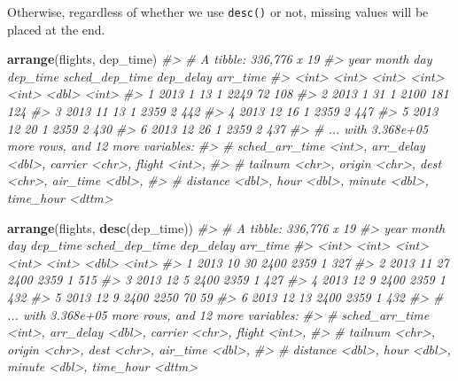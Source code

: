\documentclass[]{book}
\newenvironment{Shaded}{\begin{snugshade}}{\end{snugshade}}
\newcommand{\CommentTok}[1]{\textcolor[rgb]{0.56,0.35,0.01}{\textit{#1}}}
\newcommand{\KeywordTok}[1]{\textcolor[rgb]{0.13,0.29,0.53}{\textbf{#1}}}
\newcommand{\NormalTok}[1]{#1}
\theoremstyle{plain}
\theoremstyle{remark}
\begin{document}
Otherwise, regardless of whether we use \texttt{desc()} or not, missing
values will be placed at the end.

\begin{Shaded}
\begin{Highlighting}[]
\KeywordTok{arrange}\NormalTok{(flights, dep_time)}
\CommentTok{#> # A tibble: 336,776 x 19}
\CommentTok{#>    year month   day dep_time sched_dep_time dep_delay arr_time}
\CommentTok{#>   <int> <int> <int>    <int>          <int>     <dbl>    <int>}
\CommentTok{#> 1  2013     1    13        1           2249        72      108}
\CommentTok{#> 2  2013     1    31        1           2100       181      124}
\CommentTok{#> 3  2013    11    13        1           2359         2      442}
\CommentTok{#> 4  2013    12    16        1           2359         2      447}
\CommentTok{#> 5  2013    12    20        1           2359         2      430}
\CommentTok{#> 6  2013    12    26        1           2359         2      437}
\CommentTok{#> # ... with 3.368e+05 more rows, and 12 more variables:}
\CommentTok{#> #   sched_arr_time <int>, arr_delay <dbl>, carrier <chr>, flight <int>,}
\CommentTok{#> #   tailnum <chr>, origin <chr>, dest <chr>, air_time <dbl>,}
\CommentTok{#> #   distance <dbl>, hour <dbl>, minute <dbl>, time_hour <dttm>}
\end{Highlighting}
\end{Shaded}

\begin{Shaded}
\begin{Highlighting}[]
\KeywordTok{arrange}\NormalTok{(flights, }\KeywordTok{desc}\NormalTok{(dep_time))}
\CommentTok{#> # A tibble: 336,776 x 19}
\CommentTok{#>    year month   day dep_time sched_dep_time dep_delay arr_time}
\CommentTok{#>   <int> <int> <int>    <int>          <int>     <dbl>    <int>}
\CommentTok{#> 1  2013    10    30     2400           2359         1      327}
\CommentTok{#> 2  2013    11    27     2400           2359         1      515}
\CommentTok{#> 3  2013    12     5     2400           2359         1      427}
\CommentTok{#> 4  2013    12     9     2400           2359         1      432}
\CommentTok{#> 5  2013    12     9     2400           2250        70       59}
\CommentTok{#> 6  2013    12    13     2400           2359         1      432}
\CommentTok{#> # ... with 3.368e+05 more rows, and 12 more variables:}
\CommentTok{#> #   sched_arr_time <int>, arr_delay <dbl>, carrier <chr>, flight <int>,}
\CommentTok{#> #   tailnum <chr>, origin <chr>, dest <chr>, air_time <dbl>,}
\CommentTok{#> #   distance <dbl>, hour <dbl>, minute <dbl>, time_hour <dttm>}
\end{Highlighting}
\end{Shaded}
\end{document}
